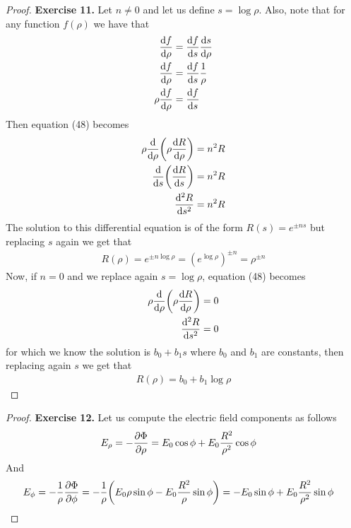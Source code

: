 \documentclass[11pt]{article}
\theoremstyle{definition}
\begin{document}
\cleardoublepage
\begin{proof}{\textbf{Exercise 11.}}
Let $n \neq 0$ and let us define $s = \log \rho$. Also, note that for any
function $f(\rho)$ we have that
\begin{align*}
    \dv{f}{\rho} &= \dv{f}{s}\dv{s}{\rho}\\
    \dv{f}{\rho} &= \dv{f}{s}\frac{1}{\rho}\\
    \rho\dv{f}{\rho} &= \dv{f}{s}
\end{align*}
Then equation (48) becomes
\begin{align*}
    \rho \dv{\rho}(\rho \dv{R}{\rho}) &= n^2 R\\
    \dv{s}(\dv{R}{s}) &= n^2 R\\
    \dv[2]{R}{s} &= n^2 R
\end{align*}
The solution to this differential equation is of the form $R(s) = e^{\pm ns}$
but replacing $s$ again we get that
\begin{align*}
    R(\rho) = e^{\pm n \log\rho} =  (e^{\log\rho})^{\pm n} = \rho^{\pm n}
\end{align*}
Now, if $n = 0$ and we replace again $s = \log \rho$, equation (48) becomes
\begin{align*}
    \rho\dv{\rho}(\rho \dv{R}{\rho}) &= 0\\
    \dv[2]{R}{s} &= 0
\end{align*}
for which we know the solution is $b_0 + b_1 s$ where $b_0$ and $b_1$ are
constants, then replacing again $s$ we get that
\begin{align*}
    R(\rho) = b_0 + b_1\log\rho
\end{align*}
\end{proof}

\cleardoublepage
\begin{proof}{\textbf{Exercise 12.}}
Let us compute the electric field components as follows
\begin{align*}
    E_\rho &= -\pdv{\Phi}{\rho}
    = E_0\cos\phi + E_0\frac{R^2}{\rho^2}\cos\phi
\end{align*}
And 
\begin{align*}
    E_\phi &= -\frac{1}{\rho}\pdv{\Phi}{\phi}
    = -\frac{1}{\rho}\bigg(E_0\rho\sin\phi
    - E_0\frac{R^2}{\rho}\sin\phi\bigg)
    = -E_0\sin\phi + E_0\frac{R^2}{\rho^2}\sin\phi
\end{align*}
\end{proof}
\end{document}
